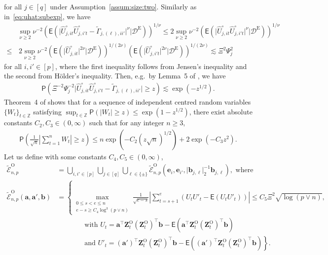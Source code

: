\documentclass[11pt, a4paper]{article}
\newcommand{\mbf}{\mathbf}
\newcommand{\mc}{\mathcal}
\renewcommand{\l}{\left}
\renewcommand{\r}{\right}
\def\wh{\widehat}
\def\wt{\widetilde}
\newcommand{\E}[0]{\mathsf{E}}
\newcommand{\p}{\mathsf{P}}
\newcommand{\Z}{\mathbb{Z}}
\newcommand{\nn}{\nonumber}
\newcommand{\tE}{\text{E}}
\newcommand{\tO}{\text{O}}
\theoremstyle{definition}
\theoremstyle{definition}
\theoremstyle{definition}
\theoremstyle{definition}
\theoremstyle{definition}
\theoremstyle{remark}
\theoremstyle{definition}
\theoremstyle{definition}
\theoremstyle{definition}
\begin{document}
for all $j \in [q]$ under Assumption~\ref{assum:size:two}.
Similarly as in~\eqref{eq:uhat:subexp}, we have
\begin{align}
& \sup_{\nu \ge 2} \nu^{-2} \l(\E\l( \vert \wh{U}_{j, it}^\circ \wh{U}_{j, i' t}^\circ - \wt{\Gamma}_{j, (\ell), ii'} \vert^\nu \big \vert \mc D^{\tE} \r)\r)^{1/\nu} 
\le 2 \sup_{\nu \ge 2} \nu^{-2} \l(\E\l( \vert \wh{U}_{j, it}^\circ \wh{U}_{j, i't}^\circ \vert^\nu  \vert \mc D^{\tE}\r)\r)^{1/\nu}\nn \\
\le & \,
2 \sup_{\nu \ge 2} \nu^{-2} \l(\E\l( \vert \wh{U}_{j, it}^\circ \vert^{2\nu} \big \vert \mc D^{\tE} \r)\r)^{1/(2\nu)} \l(\E\l( \vert \wh{U}_{j, i't}^\circ \vert^{2\nu} \big \vert \mc D^{\tE} \r)\r)^{1/(2\nu)} 
\lesssim \Xi^2 \Psi_j^2 
\label{eq:uhat:subexp:two}
\end{align}
for all $i, i' \in [p]$, where the first inequality follows from Jensen's inequality and the second from H\"{o}lder's inequality.
Then, e.g.\ by Lemma~5 of \cite{wong2020lasso}, we have
\begin{align}
\label{eq:uu:tail:prob}
    \p\l( \Xi^{-2} \Psi_j^{-2} \vert \wh{U}_{j, it}^\circ \wh{U}_{j, i' t}^\circ - \wt{\Gamma}_{j, (\ell), ii'} \vert \ge z \r) \lesssim \exp( - z^{1/2}).
\end{align}
Theorem~4 of \cite{xu2022change} shows that for a sequence of independent centred random variables $\{W_t\}_{t \in \Z}$ satisfying $\sup_{t \in \Z} \p( \vert W_t \vert \ge z) \le \exp(1 - z^{1/2})$, there exist absolute constants $C_2, C_3 \in (0, \infty)$ such that for any integer $n \ge 3$,
\begin{align}
\label{eq:xu}
\p\l( \frac{1}{\sqrt n} \l\vert \sum_{t = 1}^n W_t \r\vert \ge z \r) \le n \exp\l( - C_2 (z\sqrt{n})^{1/2} \r) + 2 \exp\l( - C_3 z^2 \r).
\end{align}
Let us define with some constants $C_4, C_5 \in (0, \infty)$,
\begin{align}
\wt{\mc E}^{\tO}_{n, p} &= \bigcup_{i, i' \in [p]} \bigcup_{j \in [q]} \bigcup_{\ell \in \{\pm\}} \wt{\mc E}^{\tO}_{n, p}(\mbf e_i, \mbf e_{i'}, \vert \mbf b_{j, \ell} \vert_2^{-1} \mbf b_{j, \ell}), \text{\ where}
\label{eq:set:e:tilde}
\\
\wt{\mc E}^{\tO}_{n, p}(\mbf a, \mbf a', \mbf b) &= \l\{ 
\max_{\substack{0 \le s < e \le n \\  e - s \ge C_4 \log^3(p \vee n)}} \frac{1}{\sqrt{e - s}} \l\vert \sum_{t = s + 1}^e \l( U_t U'_t - \E(U_t U'_t) \r) \r\vert \le C_5 \Xi^2 \sqrt{\log(p \vee n)}, 
\r.
\nn \\
& \qquad \qquad \text{with \ } 
U_t = \mbf a^\top \mbf Z_t^{\tO} (\mbf Z_t^{\tO})^\top \mbf b - \E(\mbf a^\top \mbf Z_t^{\tO} (\mbf Z_t^{\tO})^\top \mbf b)
\nn \\
& \qquad \qquad \l. \text{and \ }
U'_t = (\mbf a')^\top \mbf Z_t^{\tO} (\mbf Z_t^{\tO})^\top \mbf b - \E((\mbf a')^\top \mbf Z_t^{\tO} (\mbf Z_t^{\tO})^\top \mbf b) \r\}.
\nn
\end{align}
\end{document}
